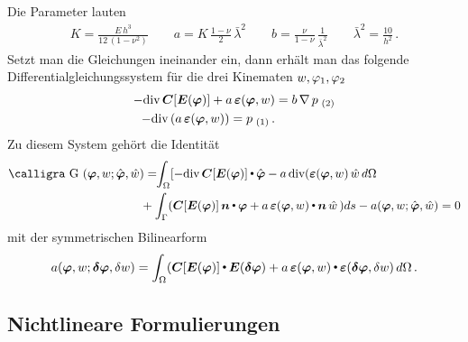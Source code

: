 Die Parameter lauten
\begin{align}
K = \frac{E\,h^3}{12\,(1 - \nu^2)} \qquad a = K\,\frac{1 - \nu}{2}\,\bar{\lambda}^2 \qquad b = \frac{\nu}{1 - \nu}\,\frac{1}{\bar{\lambda}^2} \qquad \bar{\lambda}^2 = \frac{10}{h^2}\,.
\end{align}
Setzt man die Gleichungen ineinander ein, dann erh\"{a}lt man das folgende Differentialgleichungssystem f\"{u}r die drei Kinematen $w, \varphi_1, \varphi_2$
\begin{subequations}
\begin{align}
- \text{div}\,\mbox{\boldmath $C$}[\mbox{\boldmath $E$}(\mbox{\boldmath $\varphi$} )] + a\,\mbox{\boldmath $\varepsilon$}(\mbox{\boldmath $\varphi$}, w) &= b\,\nabla\,p_{\,\,(2)} \\
- \text{div}\,(a\,\mbox{\boldmath $\varepsilon$}(\mbox{\boldmath $\varphi$} ,w)) = p_{\,\,(1)}\,.
\end{align}
\end{subequations}
Zu diesem System geh\"{o}rt die Identit\"{a}t
\begin{align}
\text{\normalfont\calligra G\,\,}(\vek \varphi ,w; \hat{\vek \varphi} ,\hat{w}) &= \!\!\int_{\Omega} [- \text{div}\,\vek C[\vek E(\vek \varphi )] \dotprod \hat{\vek \varphi } - a\,\text{div}(\vek \varepsilon(\vek \varphi ,w)\,\hat{w}\,d\Omega \nn \\
& \!\!+ \int_{\Gamma} (\vek C[\vek E(\vek \varphi )]\,\vek n \dotprod  \vek \varphi + a\,\vek \varepsilon(\vek \varphi ,w) \dotprod \vek n\,\hat{w}\,)ds
- a(\vek \varphi, w; \hat{\vek \varphi }, \hat{w}) = 0
\end{align}
mit der symmetrischen Bilinearform
\begin{align}
a(\mbox{\boldmath $\varphi$}, w; \mbox{\boldmath $\delta$} \mbox{\boldmath $\varphi$} , \delta w) = \int_{\Omega} (\mbox{\boldmath $C$}[\mbox{\boldmath $E$}(\mbox{\boldmath $\varphi$} )] {\,\scriptscriptstyle \stackrel{\bullet}{{}}}\,  \mbox{\boldmath $E$}(\mbox{\boldmath $\delta$}\mbox{\boldmath $\varphi$} ) + a\,\mbox{\boldmath $\varepsilon$} (\mbox{\boldmath $\varphi$} , w) {\,\scriptscriptstyle \stackrel{\bullet}{{}}}\,  \mbox{\boldmath $\varepsilon$}(\mbox{\boldmath $\delta$} \mbox{\boldmath $\varphi$} , \delta w) \,d\Omega\,.
\end{align}



\textcolor{sectionTitleBlue}{\section{Nichtlineare Formulierungen}}

